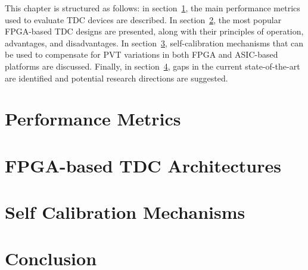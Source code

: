 This chapter is structured as follows: in section~\ref{sec:performance_metrics}, the main performance metrics used to evaluate \gls{TDC} devices are described. In section~\ref{sec:fpga_based_tdc_architectures}, the most popular \gls{FPGA}-based \gls{TDC} designs are presented, along with their principles of operation, advantages, and disadvantages. In section~\ref{sec:self_calibration_mechanisms}, self-calibration mechanisms that can be used to compensate for \gls{PVT} variations in both \gls{FPGA} and \gls{ASIC}-based platforms are discussed. Finally, in section~\ref{sec:conclusion}, gaps in the current state-of-the-art are identified and potential research directions are suggested.

\section{Performance Metrics} %
\label{sec:performance_metrics}




\section{FPGA-based TDC Architectures} %
\label{sec:fpga_based_tdc_architectures}




\section{Self Calibration Mechanisms} %
\label{sec:self_calibration_mechanisms}




\section{Conclusion} %
\label{sec:conclusion}









